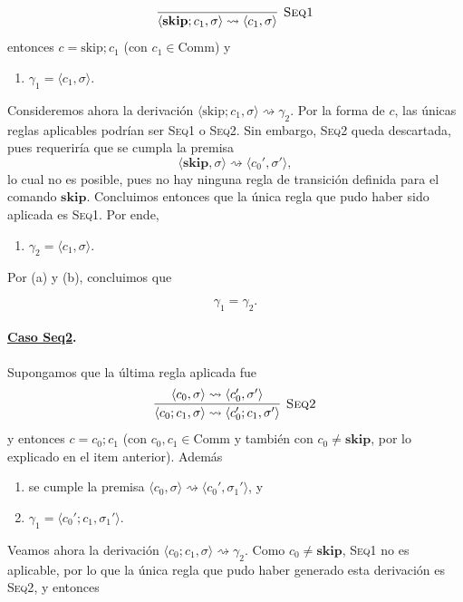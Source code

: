 \documentclass[12pt, a4paper]{article}
\begin{document}
\[
  \infer[\textsc{Seq1}]{\langle \textbf{skip}; c_1, \sigma \rangle \rightsquigarrow \langle c_1, \sigma \rangle}{}
\]
entonces $c = \mathrm{skip};c_1$ (con $c_1\in\mathrm{Comm}$) y

\begin{enumerate}
    \item[a.] $\gamma_1=\langle c_1,\sigma\rangle$.
\end{enumerate}

Consideremos ahora la derivación
$
\langle \mathrm{skip};c_1,\sigma\rangle
\rightsquigarrow
\gamma_2.
$
Por la forma de $c$, las únicas reglas aplicables podrían ser \textsc{Seq1} o \textsc{Seq2}. Sin embargo, \textsc{Seq2} queda descartada, pues requeriría que se cumpla la premisa 
\[
\langle \textbf{skip},\sigma\rangle
\rightsquigarrow
\langle c_0',\sigma'\rangle,
\]
lo cual no es posible, pues no hay ninguna regla de transición definida para el comando $\textbf{skip}$.
Concluimos entonces que la única regla que pudo haber sido aplicada es \textsc{Seq1}. Por ende,

\begin{enumerate}
    \item[b.] $\gamma_2=\langle c_1,\sigma\rangle$.
\end{enumerate}

Por (a) y (b), concluimos que 

\[\gamma_1=\gamma_2.\]


\paragraph{\underline{Caso Seq2}.}
Supongamos que la última regla aplicada fue 
\[
  \infer[\textsc{Seq2}]{\langle c_0; c_1, \sigma \rangle \rightsquigarrow \langle c'_0; c_1, \sigma' \rangle}{\langle c_0, \sigma \rangle \rightsquigarrow \langle c'_0, \sigma' \rangle}
\]
y entonces $c = c_0;c_1$ (con $c_0,c_1\in\mathrm{Comm}$ y también con $c_0\neq\textbf{skip}$, por lo explicado en el item anterior). Además
\begin{enumerate}
    \item[a.] se cumple la premisa $\langle c_0,\sigma\rangle
    \rightsquigarrow
    \langle c_0',\sigma_1'\rangle$, y

    \item[b.] $\gamma_1
    =
    \langle c_0';c_1,\sigma_1'\rangle$.
\end{enumerate}

Veamos ahora la derivación
$
\langle c_0;c_1,\sigma\rangle
\rightsquigarrow
\gamma_2.
$
Como $c_0 \neq \textbf{skip}$, \textsc{Seq1} no es aplicable, por lo que la única regla que pudo haber generado esta derivación es \textsc{Seq2}, y entonces
\end{document}
